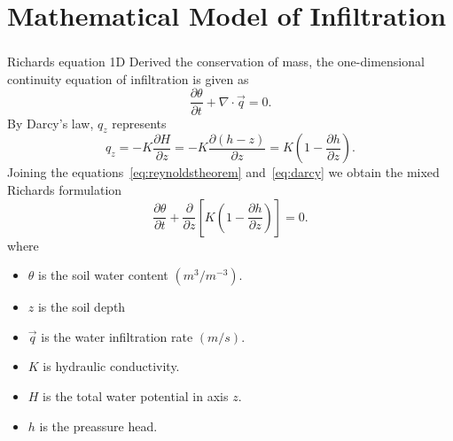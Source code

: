 \section{Mathematical Model of Infiltration}

\begin{frame}
	\frametitle{\secname}

	\begin{block}{Richards equation 1D}
		Derived the \alert{conservation of mass},
		the one-dimensional continuity equation of infiltration is given
		as
		\begin{equation}\label{eq:reynoldstheorem}
			\frac{\partial\theta}{\partial t}+
			\nabla\cdot\vec{q}=0.
		\end{equation}
		By \alert{Darcy's law}, $q_{z}$ represents
		\begin{equation}\label{eq:darcy}
			q_{z}=
			-K\frac{\partial H}{\partial z}=
			-K\frac{\partial(h-z)}{\partial z}=
			K\left(1-\frac{\partial h}{\partial z}\right).
		\end{equation}
		Joining the equations~\eqref{eq:reynoldstheorem} and~\eqref{eq:darcy}
		we obtain the \alert{mixed Richards formulation}
		\begin{equation*}
			\frac{\partial\theta}{\partial t}+
			\frac{\partial}{\partial z}
			\left[K\left(1-\frac{\partial h}{\partial z}\right)\right]=0.
		\end{equation*}
		where\vspace*{-0.4cm}
		\begin{multicols}{2}
			\begin{itemize}
				\item $\theta$ is the soil water content $\left(m^3/m^{-3}\right)$.
				\item $z$ is the soil depth
				\item $\vec{q}$ is the water infiltration rate $\left(m/s\right)$.
				\item $K$ is hydraulic conductivity.
				\item $H$ is the total water potential in axis $z$.
				\item $h$ is the preassure head.
			\end{itemize}
		\end{multicols}
	\end{block}

\end{frame}

